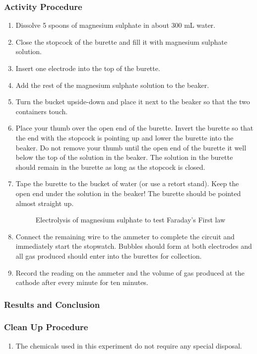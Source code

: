 \subsubsection*{Activity Procedure}
\begin{enumerate}
\item{Dissolve 5 spoons of magnesium sulphate in about 300 mL water.}
\item{Close the stopcock of the burette and fill it with magnesium sulphate solution.}
\item{Insert one electrode into the top of the burette.}
\item{Add the rest of the magnesium sulphate solution to the beaker.}
\item{Turn the bucket upside-down and place it next to the beaker so that the two containers touch.}
\item{Place your thumb over the open end of the burette. Invert the burette so that the end with the stopcock is pointing up and lower the burette into the beaker. Do not remove your thumb until the open end of the burette it well below the top of the solution in the beaker. The solution in the burette should remain in the burette as long as the stopcock is closed.}
\item{Tape the burette to the bucket of water (or use a retort stand). Keep the open end under the solution in the beaker! The burette should be pointed almost straight up.}
\begin{figure}[h!]
\begin{center}
\def\svgwidth{150pt}

\caption{Electrolysis of magnesium sulphate to test Faraday's First law}
\label{faraday-1}
\end{center}
\end{figure}
\item{Connect the remaining wire to the ammeter to complete the circuit and immediately start the stopwatch. Bubbles should form at both electrodes and all gas produced should enter into the burettes for collection.}
\item{Record the reading on the ammeter and the volume of gas produced at the cathode after every minute for ten minutes.}
\end{enumerate}

\subsubsection*{Results and Conclusion}

\subsubsection*{Clean Up Procedure}
\begin{enumerate}
\item{The chemicals used in this experiment do not require any special disposal.}
\end{enumerate}

